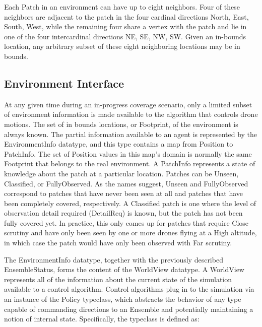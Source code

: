 
Each Patch in an environment can have up to eight neighbors. Four of these neighbors are adjacent to the patch in the four cardinal directions {North, East, South, West}, while the remaining four share a vertex with the patch and lie in one of the four intercardinal directions {NE, SE, NW, SW}. Given an in-bounds location, any arbitrary subset of these eight neighboring locations may be in bounds.


\subsection{Environment Interface}

At any given time during an in-progress coverage scenario, only a limited subset of environment information is made available to the algorithm that controls drone motions. The set of in bounds locations, or Footprint, of the environment is always known. The partial information available to an agent is represented by the EnvironmentInfo datatype, and this type contains a map from Position to PatchInfo. The set of Position values in this map's domain is normally the same Footprint that belongs to the real environment. A PatchInfo represents a state of knowledge about the patch at a particular location. Patches can be Unseen, Classified, or FullyObserved. As the names suggest, Unseen and FullyObserved correspond to patches that have never been seen at all and patches that have been completely covered, respectively. A Classified patch is one where the level of observation detail required (DetailReq) is known, but the patch has not been fully covered yet. In practice, this only comes up for patches that require Close scrutiny and have only been seen by one or more drones flying at a High altitude, in which case the patch would have only been observed with Far scrutiny.

The EnvironmentInfo datatype, together with the previously described EnsembleStatus, forms the content of the WorldView datatype. A WorldView represents all of the information about the current state of the simulation available to a control algorithm. Control algorithms plug in to the simulation via an instance of the Policy typeclass, which abstracts the behavior of any type capable of commanding directions to an Ensemble and potentially maintaining a notion of internal state. Specifically, the typeclass is defined as:

